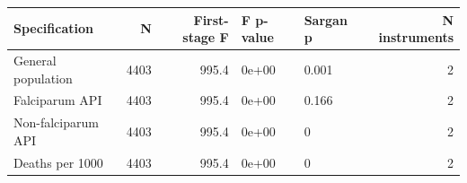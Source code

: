{\small

\begin{tabular}[t]{lrrllr}
\toprule
Specification & N & First-stage F & F p-value & Sargan p & N instruments\\
\midrule
General population & 4403 & 995.4 & 0e+00 & 0.001 & 2\\
Falciparum API & 4403 & 995.4 & 0e+00 & 0.166 & 2\\
Non-falciparum API & 4403 & 995.4 & 0e+00 & 0 & 2\\
Deaths per 1000 & 4403 & 995.4 & 0e+00 & 0 & 2\\
\bottomrule
\end{tabular}
}
